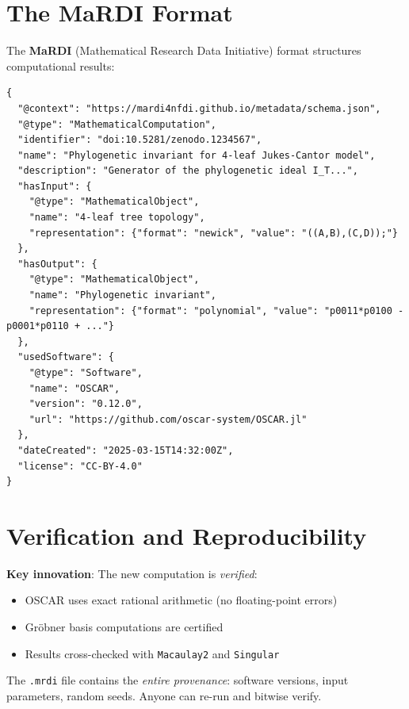\section{The MaRDI Format}
\label{sec:fair:mardi}

The \textbf{MaRDI} (Mathematical Research Data Initiative) format structures computational results:

\begin{lstlisting}[style=json,caption=Example .mrdi file for a phylogenetic invariant]
{
  "@context": "https://mardi4nfdi.github.io/metadata/schema.json",
  "@type": "MathematicalComputation",
  "identifier": "doi:10.5281/zenodo.1234567",
  "name": "Phylogenetic invariant for 4-leaf Jukes-Cantor model",
  "description": "Generator of the phylogenetic ideal I_T...",
  "hasInput": {
    "@type": "MathematicalObject",
    "name": "4-leaf tree topology",
    "representation": {"format": "newick", "value": "((A,B),(C,D));"}
  },
  "hasOutput": {
    "@type": "MathematicalObject",
    "name": "Phylogenetic invariant",
    "representation": {"format": "polynomial", "value": "p0011*p0100 - p0001*p0110 + ..."}
  },
  "usedSoftware": {
    "@type": "Software",
    "name": "OSCAR",
    "version": "0.12.0",
    "url": "https://github.com/oscar-system/OSCAR.jl"
  },
  "dateCreated": "2025-03-15T14:32:00Z",
  "license": "CC-BY-4.0"
}
\end{lstlisting}

\section{Verification and Reproducibility}
\label{sec:fair:verify}

\textbf{Key innovation}: The new computation is \emph{verified}:
\begin{itemize}
    \item OSCAR uses exact rational arithmetic (no floating-point errors)
    \item Gröbner basis computations are certified
    \item Results cross-checked with \texttt{Macaulay2} and \texttt{Singular}
\end{itemize}

The \texttt{.mrdi} file contains the \emph{entire provenance}: software versions, input parameters, random seeds. Anyone can re-run and bitwise verify.

